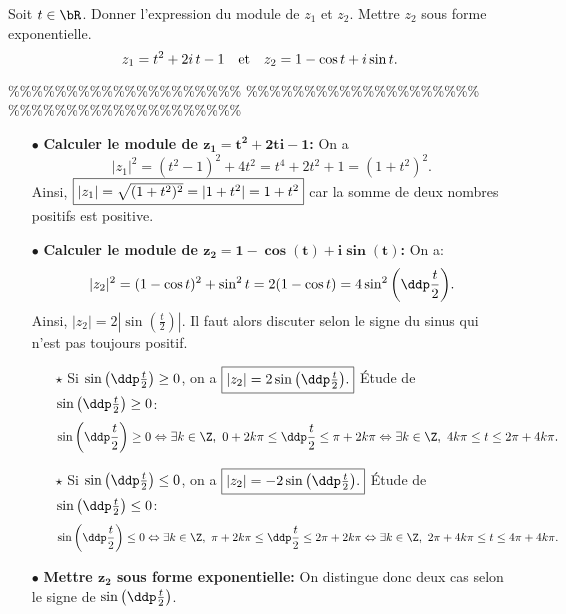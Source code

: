 



\begin{exercice}  \;
Soit $t \in \bR$. Donner l'expression du module de $z_1$ et $z_2$. Mettre $z_2$ sous forme exponentielle.
$$z_1=t^2+2i \, t-1\quad\hbox{et}\quad z_2=1-\cos{t}+i\sin{t}.$$
\end{exercice}


\%\%\%\%\%\%\%\%\%\%\%\%\%\%\%\%\%\%\%\%
\%\%\%\%\%\%\%\%\%\%\%\%\%\%\%\%\%\%\%\%
\%\%\%\%\%\%\%\%\%\%\%\%\%\%\%\%\%\%\%\%




\begin{correction}   \;
\begin{itemize}
\item[$\bullet$] \textbf{Calculer le module de $\mathbf{z_1=t^2+2ti-1}$:} On a 
$$|z_1|^2=(t^2-1)^2+4t^2=t^4+2t^2+1=(1+t^2)^2.$$
Ainsi, $\fbox{$|z_1|=\sqrt{(1+t^2)^2}=|1+t^2|=1+t^2$}$ car la somme de deux nombres positifs est positive.
\item[$\bullet$] \textbf{Calculer le module de $\mathbf{z_2=1-\cos{(t)}+i\sin{(t)} }$:} On a:
$$|z_2|^2=(1-\cos{t})^2+\sin^2{t}=2(1-\cos{t})=4\sin^2{\left(\ddp\frac{t}{2}\right)}.$$
Ainsi, $|z_2|=2|\sin{\left(\frac{t}{2}\right)}|$. Il faut alors discuter selon le signe du sinus qui n'est pas toujours positif.
\begin{itemize}
\item[$\star$] Si $\sin{\left(\ddp\frac{t}{2}\right)}\geq 0$, on a $\fbox{$|z_2|=2\sin{\left( \ddp\frac{t}{2} \right)}.$}$ \'Etude de $\sin{\left(\ddp\frac{t}{2}\right)}\geq 0$:
$$\sin{\left(\ddp\frac{t}{2}\right)}\geq 0 \Leftrightarrow  \exists k\in\Z,\ 0+2k\pi\leq \ddp\frac{t}{2}\leq \pi+2k\pi\Leftrightarrow \exists k\in\Z,\ 4k\pi\leq t \leq 2\pi+4k\pi.$$
\item[$\star$] Si $\sin{\left(\ddp\frac{t}{2}\right)}\leq 0$, on a $\fbox{$|z_2|=-2\sin{\left( \ddp\frac{t}{2} \right)}.$}$ \'Etude de $\sin{\left(\ddp\frac{t}{2}\right)}\leq 0$:
$$
\sin{\left(\ddp\frac{t}{2}\right)}\leq 0 \Leftrightarrow  \exists k\in\Z,\ \pi+2k\pi\leq \ddp\frac{t}{2}\leq 2\pi+2k\pi\Leftrightarrow  \exists k\in\Z,\ 2\pi+4k\pi\leq t \leq 4\pi+4k\pi.$$
\end{itemize}
\item[$\bullet$] \textbf{Mettre $\mathbf{z_2}$ sous forme exponentielle:} On distingue donc deux cas selon le signe de $\sin{\left(\ddp\frac{t}{2}\right)}$.

\end{itemize}
\end{correction}

